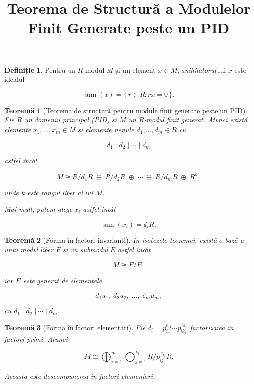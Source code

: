 \documentclass[12pt]{article}
\title{Teorema de Structură a Modulelor Finit Generate peste un PID}
\author{}
\date{}
\theoremstyle{definition}
\newtheorem{definition}{Definiție}
\theoremstyle{plain}
\newtheorem{theorem}{Teoremă}
\begin{document}
\maketitle

\begin{definition}
Pentru un $R$-modul $M$ și un element $x \in M$, \emph{anihilatorul} lui $x$ este idealul


\[
\operatorname{ann}(x) = \{\, r \in R : r x = 0 \,\}.
\]


\end{definition}

\begin{theorem}[Teorema de structură pentru module finit generate peste un PID]
Fie $R$ un domeniu principal (PID) și $M$ un $R$-modul finit generat. Atunci există
elemente $x_1, \dots, x_m \in M$ și elemente nenule $d_1, \dots, d_m \in R$ cu


\[
d_1 \mid d_2 \mid \cdots \mid d_m
\]


astfel încât


\[
M \cong R/d_1 R \;\oplus\; R/d_2 R \;\oplus\; \cdots \;\oplus\; R/d_m R \;\oplus\; R^k,
\]


unde $k$ este rangul liber al lui $M$.

Mai mult, putem alege $x_i$ astfel încât


\[
\operatorname{ann}(x_i) = d_i R.
\]


\end{theorem}

\begin{theorem}[Forma în factori invarianti]
În ipotezele teoremei, există o bază a unui modul liber $F$ și un submodul $E$ astfel încât


\[
M \cong F/E,
\]


iar $E$ este generat de elementele


\[
d_1 u_1,\; d_2 u_2,\; \dots,\; d_m u_m,
\]


cu $d_1 \mid d_2 \mid \cdots \mid d_m$.
\end{theorem}

\begin{theorem}[Forma în factori elementari]
Fie $d_i = p_{i1}^{e_{i1}} \cdots p_{ik_i}^{e_{ik_i}}$ factorizarea în factori primi.
Atunci


\[
M \cong \bigoplus_{i=1}^m \bigoplus_{j=1}^{k_i} R / p_{ij}^{\, e_{ij}} R.
\]


Aceasta este descompunerea în factori elementari.
\end{theorem}
\end{document}
